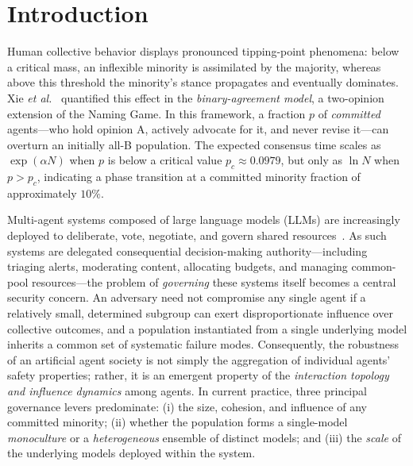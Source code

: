 \documentclass[manuscript,screen,review]{acmart}
\begin{document}


\maketitle

\section{Introduction}
Human collective behavior displays pronounced tipping-point phenomena: below a critical mass, an inflexible minority is assimilated by the majority, whereas above this threshold the minority’s stance propagates and eventually dominates. Xie \emph{et al.}~\cite{xie2011} quantified this effect in the \emph{binary-agreement model}, a two-opinion extension of the Naming Game. In this framework, a fraction $p$ of \emph{committed} agents—who hold opinion A, actively advocate for it, and never revise it—can overturn an initially all-B population. The expected consensus time scales as $\exp(\alpha N)$ when $p$ is below a critical value $p_c \approx 0.0979$, but only as $\ln N$ when $p > p_c$, indicating a phase transition at a committed minority fraction of approximately $10\%$.

Multi-agent systems composed of large language models (LLMs) are increasingly deployed to deliberate, vote, negotiate, and govern shared resources~\cite{piatti2024,ashery2025}. As such systems are delegated consequential decision-making authority—including triaging alerts, moderating content, allocating budgets, and managing common-pool resources—the problem of \emph{governing} these systems itself becomes a central security concern. An adversary need not compromise any single agent if a relatively small, determined subgroup can exert disproportionate influence over collective outcomes, and a population instantiated from a single underlying model inherits a common set of systematic failure modes. Consequently, the robustness of an artificial agent society is not simply the aggregation of individual agents’ safety properties; rather, it is an emergent property of the \emph{interaction topology and influence dynamics} among agents. In current practice, three principal governance levers predominate: (i) the size, cohesion, and influence of any committed minority; (ii) whether the population forms a single-model \emph{monoculture} or a \emph{heterogeneous} ensemble of distinct models; and (iii) the \emph{scale} of the underlying models deployed within the system.
\end{document}
